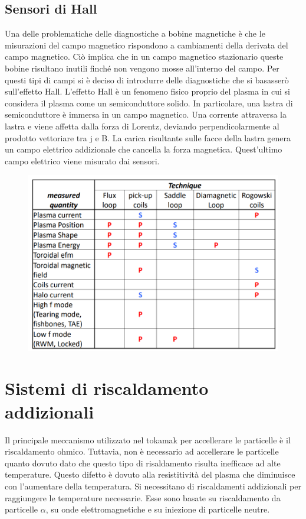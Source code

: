 \documentclass{article}
\begin{document}
\subsection{Sensori di Hall}
Una delle problematiche delle diagnostiche a bobine magnetiche è che le misurazioni del campo magnetico rispondono a cambiamenti della derivata del campo magnetico. Ciò implica che in un campo magnetico stazionario queste bobine risultano inutili finché non vengono mosse all'interno del campo.\newline
Per questi tipi di campi si è deciso di introdurre delle diagnostiche che si basasserò sull'effetto Hall.\newline
L'effetto Hall è un fenomeno fisico proprio del plasma in cui si considera il plasma come un semiconduttore solido. In particolare, una lastra di semiconduttore è immersa in un campo magnetico. Una corrente attraversa la lastra e viene affetta dalla forza di Lorentz, deviando perpendicolarmente al prodotto vettoriare tra j e B.\newline
La carica risultante sulle facce della lastra genera un campo elettrico addizionale che cancella la forza magnetica. Quest'ultimo campo elettrico viene misurato dai sensori.
\begin{figure}
    \centering
    \includegraphics[scale=0.4]{2022-06-29-11-20-10.png}%
\end{figure}
\section{Sistemi di riscaldamento addizionali}
Il principale meccanismo utilizzato nel tokamak per accellerare le particelle è il riscaldamento ohmico. Tuttavia, non è necessario ad accellerare le particelle quanto dovuto dato che questo tipo di risaldamento risulta inefficace ad alte temperature. Questo difetto è dovuto alla resistitività del plasma che diminuisce con l'aumentare della temperatura.\newline
Si necessitano di riscaldamenti addizionali per raggiungere le temperature necessarie. Esse sono basate su riscaldamento da particelle \(\alpha \), su onde elettromagnetiche e su iniezione di particelle neutre.
\end{document}
